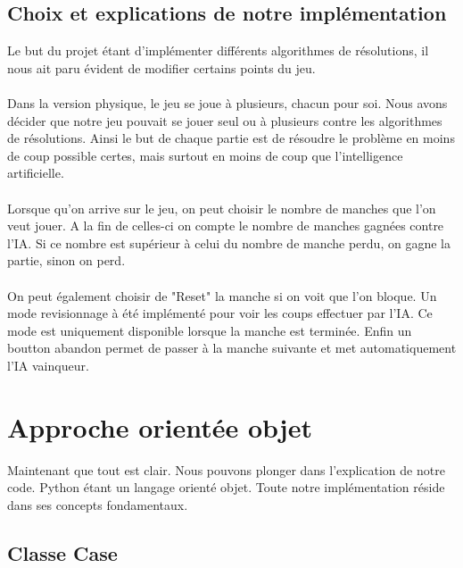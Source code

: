 \documentclass{article}
\begin{document}
\subsection{Choix et explications de notre implémentation}
Le but du projet étant d'implémenter différents algorithmes de résolutions, il nous ait paru évident de modifier certains points du jeu.\\\\Dans la version physique, le jeu se joue à plusieurs, chacun pour soi. Nous avons décider que notre jeu pouvait se jouer seul ou à plusieurs contre les algorithmes de résolutions. Ainsi le but de chaque partie est de résoudre le problème en moins de coup possible certes, mais surtout en moins de coup que l'intelligence artificielle.\\\\Lorsque qu'on arrive sur le jeu, on peut choisir le nombre de  manches que l'on veut jouer. A la fin de celles-ci on compte le nombre de manches gagnées contre l'IA. Si ce nombre est supérieur à celui du nombre de manche perdu, on gagne la partie, sinon on perd.\\\\On peut également choisir de "Reset" la manche si on voit que l'on bloque. Un mode revisionnage à été implémenté pour voir les coups effectuer par l'IA. Ce mode est uniquement disponible lorsque la manche est terminée. Enfin un boutton abandon permet de passer à la manche suivante et met automatiquement l'IA vainqueur.
\section{Approche orientée objet}
Maintenant que tout est clair. Nous pouvons plonger dans l'explication de notre code. Python étant un langage orienté objet. Toute notre implémentation réside dans ses concepts fondamentaux.

\subsection{Classe Case}
\end{document}
